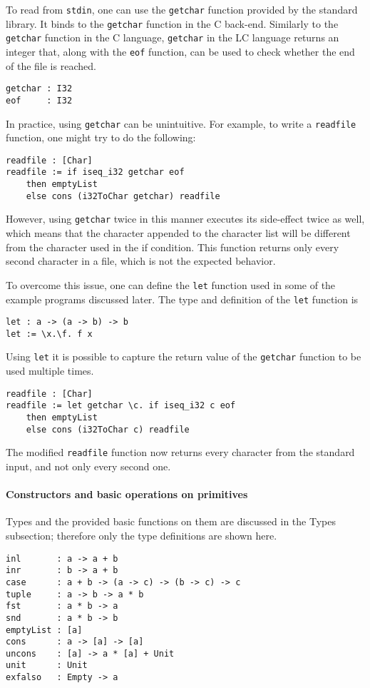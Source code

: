 \documentclass[12pt]{article}
\begin{document}
To read from \verb$stdin$, one can use the \verb$getchar$ function provided by
the standard library. It binds to the \verb$getchar$ function in the C back-end.
Similarly to the \verb$getchar$ function in the C language, \verb$getchar$ in
the LC language returns an integer that, along with the \verb$eof$ function, can
be used to check whether the end of the file is reached.
\begin{lstlisting}
getchar : I32
eof     : I32
\end{lstlisting}
In practice, using \verb$getchar$ can be unintuitive. For example, to write a 
\verb$readfile$ function, one might try to do the following:
\begin{lstlisting}
readfile : [Char]
readfile := if iseq_i32 getchar eof 
    then emptyList 
    else cons (i32ToChar getchar) readfile
\end{lstlisting}
However, using \verb$getchar$ twice in this manner executes its side-effect
twice as well, which means that the character appended to the character list
will be different from the character used in the if condition. This function
returns only every second character in a file, which is not the expected
behavior.

To overcome this issue, one can define the \verb$let$ function used in some of
the example programs discussed later. The type and definition of the \verb$let$
function is
\begin{lstlisting}
let : a -> (a -> b) -> b
let := \x.\f. f x
\end{lstlisting}
Using \verb$let$ it is possible to capture the return value of the
\verb$getchar$ function to be used multiple times.
\begin{lstlisting}
readfile : [Char]
readfile := let getchar \c. if iseq_i32 c eof 
    then emptyList 
    else cons (i32ToChar c) readfile
\end{lstlisting}
The modified \verb$readfile$ function now returns every character from the
standard input, and not only every second one.

\paragraph{Constructors and basic operations on primitives} Types and the
provided basic functions on them are discussed in the Types subsection;
therefore only the type definitions are shown here.
\begin{lstlisting}
inl       : a -> a + b
inr       : b -> a + b
case      : a + b -> (a -> c) -> (b -> c) -> c
tuple     : a -> b -> a * b
fst       : a * b -> a
snd       : a * b -> b
emptyList : [a]
cons      : a -> [a] -> [a]
uncons    : [a] -> a * [a] + Unit
unit      : Unit
exfalso   : Empty -> a
\end{lstlisting}
\end{document}
